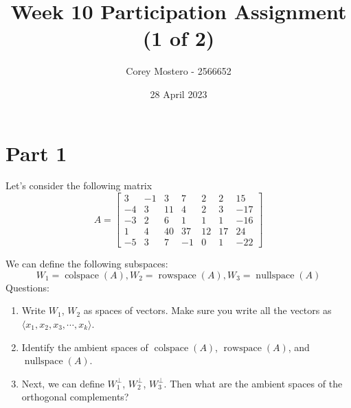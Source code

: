 \documentclass{article}
\title{Week 10 Participation Assignment (1 of 2)}
\author{Corey Mostero - 2566652}
\date{28 April 2023}
\DeclareMathOperator{\colspace}{colspace}
\DeclareMathOperator{\rowspace}{rowspace}
\DeclareMathOperator{\nullspace}{nullspace}
\begin{document}
\newcommand{\hr}{\par\noindent\rule{\textwidth}{0.4pt}}

\newcommand{\bc}[1]{
	\begin{equation*}
		\begin{boxed}
			{#1}
		\end{boxed}
	\end{equation*}
}

\newcommand{\cond}[2]{
	\ifmmode
		{#1} \quad {#2}
	\else
		$$ {#1} \quad {#2} $$
	\fi
}

\maketitle
\newpage

\tableofcontents

\section{Part 1}

Let's consider the following matrix
\begin{equation*}
	A = \begin{bmatrix}
		3 & -1 & 3 & 7 & 2 & 2 & 15 \\
		-4 & 3 & 11 & 4 & 2 & 3 & -17 \\
		-3 & 2 & 6 & 1 & 1 & 1 & -16 \\
		1 & 4 & 40 & 37 & 12 & 17 & 24 \\
		-5 & 3 & 7 & -1 & 0 & 1 & -22
	\end{bmatrix}
\end{equation*}

We can define the following subspaces:
\begin{equation*}
	W_1 = \colspace(A), W_2 = \rowspace(A), W_3 = \nullspace(A)
\end{equation*}
Questions:
\begin{enumerate}[label = \textbf{\arabic*)}]
	\item
		Write $ W_1 $, $ W_2 $ as spaces of vectors. Make sure you write all the vectors as $ \langle x_1, x_2, x_3, \cdots, x_k \rangle $.
	\item
		Identify the ambient spaces of $ \colspace(A) $, $ \rowspace(A) $, and $ \nullspace(A) $.
	\item
		Next, we can define $ W_1^\perp $, $ W_2^\perp $, $ W_3^\perp $. Then what are the ambient spaces of the orthogonal complements?
\end{enumerate}
\end{document}
